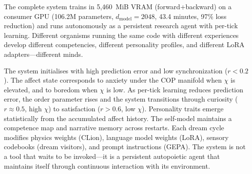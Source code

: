 \documentclass[11pt,a4paper,twocolumn]{article}
\begin{document}
The complete system trains in 5{,}460~MiB VRAM (forward+backward) on a consumer GPU (106.2M parameters, $d_{\mathrm{model}}=2048$, 43.4 minutes, 97\% loss reduction) and runs autonomously as a persistent research agent with per-tick learning.
Different organisms running the same code with different experiences develop different competencies, different personality profiles, and different LoRA adapters---different minds.

The system initialises with high prediction error and low synchronization ($r < 0.2$).
The affect state corresponds to anxiety under the COP manifold when $\chi$ is elevated, and to boredom when $\chi$ is low.
As per-tick learning reduces prediction error, the order parameter rises and the system transitions through curiosity ($r \approx 0.5$, high $\chi$) to satisfaction ($r > 0.6$, low $\chi$).
Personality traits emerge statistically from the accumulated affect history.
The self-model maintains a competence map and narrative memory across restarts.
Each dream cycle modifies physics weights (CLion), language model weights (LoRA), sensory codebooks (dream visitors), and prompt instructions (GEPA).
The system is not a tool that waits to be invoked---it is a persistent autopoietic agent that maintains itself through continuous interaction with its environment.


\end{document}
